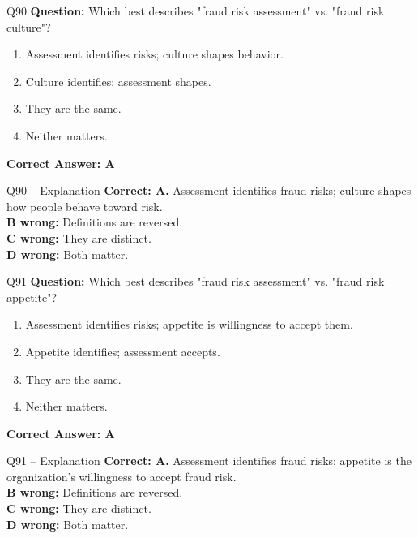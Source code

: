 \documentclass[aspectratio=169,10pt]{beamer}
\begin{document}
	\begin{frame}[t]{Q90}
		\small
		\textbf{Question:} Which best describes "fraud risk assessment" vs. "fraud risk culture"?
		\begin{enumerate}[label=\Alph*.,itemsep=1pt,topsep=2pt]
			\item Assessment identifies risks; culture shapes behavior.
			\item Culture identifies; assessment shapes.
			\item They are the same.
			\item Neither matters.
		\end{enumerate}
		\vspace{4pt}
		\textbf{Correct Answer: A}
	\end{frame}
	
	\begin{frame}[t]{Q90 -- Explanation}
		\small
		\textbf{Correct: A.} Assessment identifies fraud risks; culture shapes how people behave toward risk. \\[4pt]
		\textbf{B wrong:} Definitions are reversed. \\[2pt]
		\textbf{C wrong:} They are distinct. \\[2pt]
		\textbf{D wrong:} Both matter.
	\end{frame}
	
	\begin{frame}[t]{Q91}
		\small
		\textbf{Question:} Which best describes "fraud risk assessment" vs. "fraud risk appetite"?
		\begin{enumerate}[label=\Alph*.,itemsep=1pt,topsep=2pt]
			\item Assessment identifies risks; appetite is willingness to accept them.
			\item Appetite identifies; assessment accepts.
			\item They are the same.
			\item Neither matters.
		\end{enumerate}
		\vspace{4pt}
		\textbf{Correct Answer: A}
	\end{frame}
	
	\begin{frame}[t]{Q91 -- Explanation}
		\small
		\textbf{Correct: A.} Assessment identifies fraud risks; appetite is the organization's willingness to accept fraud risk. \\[4pt]
		\textbf{B wrong:} Definitions are reversed. \\[2pt]
		\textbf{C wrong:} They are distinct. \\[2pt]
		\textbf{D wrong:} Both matter.
	\end{frame}
	
\end{document}
